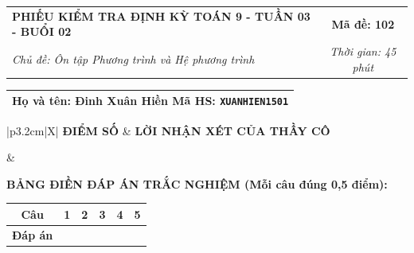 \documentclass[12pt,a4paper]{article}
\begin{document}
\newpage


\noindent
\begin{tabularx}{\linewidth}{|X|c|}
\hline
\textbf{PHIẾU KIỂM TRA ĐỊNH KỲ TOÁN 9 - TUẦN 03 - BUỔI 02} & \textbf{Mã đề: 102} \\
\textit{Chủ đề: Ôn tập Phương trình và Hệ phương trình} & \textit{Thời gian: 45 phút} \\
\hline
\end{tabularx}

\vspace{1mm}

\noindent
\begin{tabularx}{\linewidth}{|X|}
\hline
\rule[-2mm]{0pt}{7.5mm}\textbf{Họ và tên:} \textbf{\large Đinh Xuân Hiền} \hfill \textbf{Mã HS:} \texttt{XUANHIEN1501} \quad \\
\hline
\end{tabularx}

\vspace{1mm}

\noindent
\begin{tabularx}{\linewidth}{|p{3.2cm}|X|}
\hline
\centering\textbf{ĐIỂM SỐ} & \centering\textbf{LỜI NHẬN XÉT CỦA THẦY CÔ} \tabularnewline
\hline
\rule{0pt}{1.3cm} & \tabularnewline
\hline
\end{tabularx}

\vspace{1.2mm}

\noindent\textbf{BẢNG ĐIỀN ĐÁP ÁN TRẮC NGHIỆM (Mỗi câu đúng 0,5 điểm):}
\vspace{0.8mm}

\noindent
\renewcommand{\arraystretch}{1.35}
\begin{tabularx}{\linewidth}{|c|*{5}{>{\centering\arraybackslash}X|}}
\hline
\textbf{Câu} & \textbf{1} & \textbf{2} & \textbf{3} & \textbf{4} & \textbf{5} \\
\hline
\textbf{Đáp án} & & & & & \\
\hline
\end{tabularx}
\renewcommand{\arraystretch}{1.0}

\vspace{1.5mm}
\end{document}
